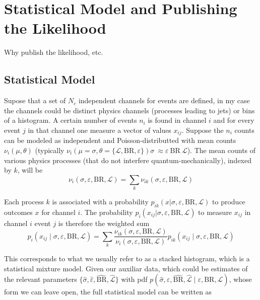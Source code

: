 \chapter{Statistical Model and Publishing the Likelihood}
\label{stats_likelihood}
Why publish the likelihood, etc.




\section{Statistical Model}
Supose that a set of $N_c$ independent channels for events are defined, in my case the channels could be distinct physics channels (processes leading to jets) or bins of a histogram. A certain number of events $n_i$ is found in channel $i$ and for every event $j$ in that channel one measure a vector of values $x_{ij}$. Suppose the $n_i$ counts can be modeled as independent and Poisson-distributted with mean counts $\nu_i (\mu, \theta)$ (typically $\nu_i (\mu=\sigma, \theta=\{ \mathcal{L}, \text{BR}, \varepsilon \})  \sigma \ \approx \varepsilon \ \text{BR} \ \mathcal{L}$). The mean counts of various physics processes (that do not interfere quantum-mechanically), indexed by $k$, will be
\begin{equation}
    \nu_{i}(\sigma, \varepsilon, \text{BR}, \mathcal{L})=\sum_{k} \nu_{i k}(\sigma, \varepsilon, \text{BR}, \mathcal{L})
\end{equation}

Each process $k$ is associated with a probability $p_{ik} (x| \sigma, \varepsilon, \text{BR}, \mathcal{L})$ to produce outcomes $x$ for channel $i$. The probability $p_i (x_{ij}| \sigma, \varepsilon, \text{BR}, \mathcal{L})$ to measure $x_{ij}$ in channel $i$ event $j$ is therefore the weighted sum
\begin{equation}
    p_{i}\left(x_{i j} \mid \sigma, \varepsilon, \text{BR}, \mathcal{L}\right)=\sum_{k} \frac{\nu_{i k}(\sigma, \varepsilon, \text{BR}, \mathcal{L})}{\nu_{i}(\sigma, \varepsilon, \text{BR}, \mathcal{L})} p_{i k}\left(x_{i j} \mid \sigma, \varepsilon, \text{BR}, \mathcal{L}\right)
\end{equation}

This corresponds to what we usually refer to as a stacked histogram, which is a statistical mixture model. Given our auxiliar data, which could be estimates of the relevant parameters $\{ \hat{\sigma}, \hat{\varepsilon}, \hat{\text{BR}}, \hat{\mathcal{L}} \}$ with pdf $p(\hat{\sigma}, \hat{\varepsilon}, \hat{\text{BR}}, \hat{\mathcal{L}} \mid \varepsilon, \text{BR}, \mathcal{L} )$, whose form we can leave open, the full statistical model can be written as

